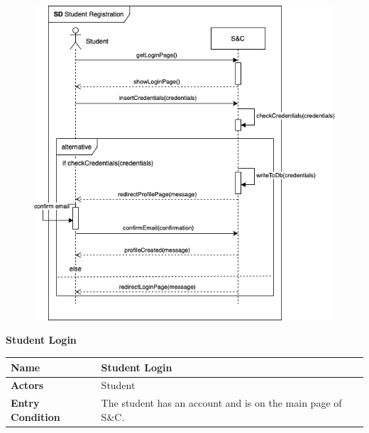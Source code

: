 \begin{enumerate}[label=\textbf{[US\arabic*]}, left = 0pt, align = left, resume]
                    \begin{figure}[h!]
                \centering
                    \includegraphics[width=1\textwidth]{RASD/Images/UseCases/StudentRegistration.drawio.png}
                \label{fig:example}
                \end{figure}

            \newpage
            \item \textbf{Student Login}
            
            \begin{longtable}{|l|p{11cm}|}  
                \hline
                \textbf{Name} & 
                    \textbf{Student Login} \\
                \hline
                
                \textbf{Actors} & 
                    Student \\
                \hline
                
                \textbf{Entry Condition} & 
                    The student has an account and is on the main page of S\&C. \\
                \hline
                

\end{longtable}
\end{enumerate}
